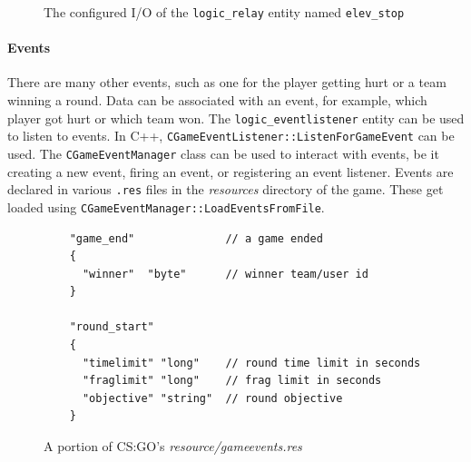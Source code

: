 \documentclass[a4paper, 12pt]{scrartcl}
\begin{document}
\begin{figure}[!htb]
  \centering
  \qquad
  \caption{The configured I/O of the \texttt{logic\_relay} entity named \texttt{elev\_stop}}
  \label{fig:source_elev_stop}
\end{figure}

\paragraph{Events}
There are many other events, such as one for the player getting hurt or a team winning a round. Data can be associated with an event, for example, which player got hurt or which team won. The \texttt{logic\_eventlistener} entity can be used to listen to events. In C++, \texttt{CGameEventListener::ListenForGameEvent} can be used. The \texttt{CGameEventManager} class can be used to interact with events, be it creating a new event, firing an event, or registering an event listener. Events are declared in various \texttt{.res} files in the \textit{resources} directory of the game. These get loaded using \texttt{CGameEventManager::LoadEventsFromFile}.

\begin{figure}[!htb]
  \begin{verbatim}
    "game_end"              // a game ended
    {
      "winner"  "byte"      // winner team/user id
    }

    "round_start"
    {
      "timelimit" "long"    // round time limit in seconds
      "fraglimit" "long"    // frag limit in seconds
      "objective" "string"  // round objective
    }
  \end{verbatim}
  \caption{A portion of CS:GO's \textit{resource/gameevents.res}}
  \label{fig:source_gameevents}
\end{figure}
\end{document}
